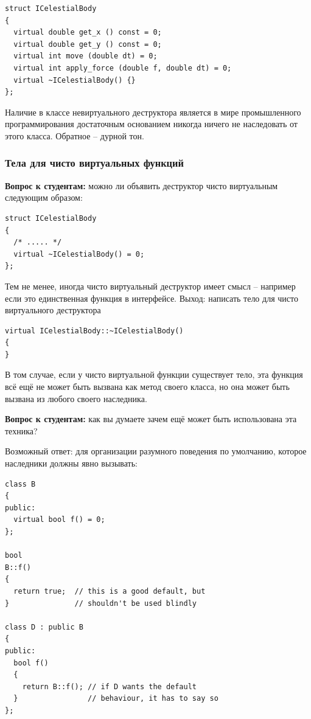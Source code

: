 \documentclass[a4paper,12pt,oneside]{article}
\newif\ifanswers
\begin{document}
\begin{lstlisting}
struct ICelestialBody
{
  virtual double get_x () const = 0;
  virtual double get_y () const = 0;
  virtual int move (double dt) = 0;
  virtual int apply_force (double f, double dt) = 0;
  virtual ~ICelestialBody() {}
};
\end{lstlisting}

Наличие в классе невиртуального деструктора является в мире промышленного программирования достаточным основанием никогда ничего не наследовать от этого класса. Обратное – дурной тон. 

\subsubsection{Тела для чисто виртуальных функций}\label{VirtdestrBody}

\textbf{Вопрос к студентам:} можно ли объявить деструктор чисто виртуальным следующим образом:

\begin{lstlisting}
struct ICelestialBody
{
  /* ..... */
  virtual ~ICelestialBody() = 0;
};
\end{lstlisting}

\ifanswers
Правильный ответ: да, можно, но это приведет к pure virtual function call при попытке унчитожить любого наследника такого класса.
\fi

Тем не менее, иногда чисто виртуальный деструктор имеет смысл -- например если это единственная функция в интерфейсе. Выход: написать тело для чисто виртуального деструктора

\begin{lstlisting}
virtual ICelestialBody::~ICelestialBody()
{
}
\end{lstlisting}

В том случае, если у чисто виртуальной функции существует тело, эта функция всё ещё не может быть вызвана как метод своего класса, но она может быть вызвана из любого своего наследника.

\textbf{Вопрос к студентам:} как вы думаете зачем ещё может быть использована эта техника?

\ifanswers
Возможный ответ: для организации разумного поведения по умолчанию, которое наследники должны явно вызывать:

\begin{lstlisting}
class B 
{
public:
  virtual bool f() = 0;
};

bool 
B::f() 
{
  return true;  // this is a good default, but
}               // shouldn't be used blindly

class D : public B 
{
public:
  bool f() 
  {
    return B::f(); // if D wants the default
  }                // behaviour, it has to say so
};
\end{lstlisting}
\end{document}
